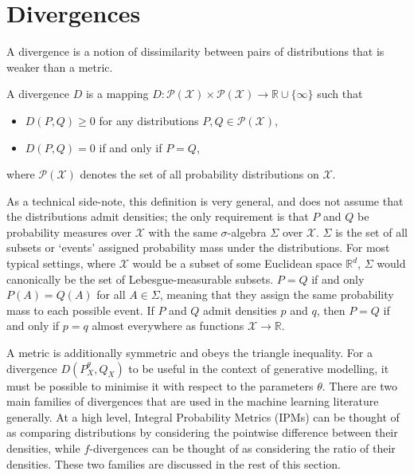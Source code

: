 \section{Divergences}\label{subsec:gen-model-divergence}

A divergence is a notion of dissimilarity between pairs of distributions that is weaker than a metric.

\medskip

\begin{definition}
A divergence $D$ is a mapping $D: \mathcal{P}(\mathcal{X}) \times \mathcal{P}(\mathcal{X}) \to \mathbb{R} \cup \{\infty\}$ such that

\begin{itemize}
\item $D(P, Q)  \geq 0$ for any distributions $P, Q \in \mathcal{P}(\mathcal{X})$,
\item $D(P, Q) = 0$ if and only if $P = Q$,
\end{itemize}

where $\mathcal{P}(\mathcal{X})$ denotes the set of all probability distributions on $\mathcal{X}$.
\end{definition}

As a technical side-note, this definition is very general, and does not assume that the distributions admit densities; the only requirement is that $P$ and $Q$ be probability measures over $\mathcal{X}$ with the same $\sigma$-algebra $\Sigma$ over $\mathcal{X}$.
$\Sigma$ is the set of all subsets or `events' assigned probability mass under the distributions.
For most typical settings, where $\mathcal{X}$ would be a subset of some Euclidean space $\mathbb{R}^d$, $\Sigma$ would canonically be the set of Lebesgue-measurable subsets.
$P = Q$ if and only  $P(A) = Q(A)$ for all $A\in \Sigma$, meaning that they assign the same probability mass to each possible event. 
If $P$ and $Q$ admit densities $p$ and $q$, then $P=Q$ if and only if $p=q$ almost everywhere as functions $\mathcal{X} \rightarrow \mathbb{R}$.

A metric is additionally symmetric and obeys the triangle inequality.
For a divergence $D(P^\theta_X, Q_X)$ to be useful in the context of generative modelling, it must be possible to minimise it with respect to the parameters $\theta$. 
There are two main families of divergences that are used in the machine learning literature generally.
At a high level, Integral Probability Metrics (IPMs) can be thought of as comparing distributions by considering the pointwise difference between their densities, while $f$-divergences can be thought of as considering the ratio of their densities.
These two families are discussed in the rest of this section.


